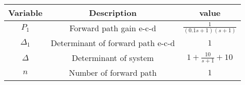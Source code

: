     \begin{tabular}{|c|c|c|} 
    \hline
\textbf{Variable} & \textbf{Description} & \textbf{value} \\\hline
    $P_{1}$ & Forward path gain e-c-d & $\frac{1}{(0.1s+1)(s+1)}$ \\\hline
    $\Delta_{1}$ & Determinant of forward path e-c-d & $1$ \\\hline
    $\Delta$ & Determinant of system & $1+\frac{10}{s+1}+10$ \\\hline
    $n$ & Number of forward path & $1$ \\\hline
    \end{tabular}
    
    
